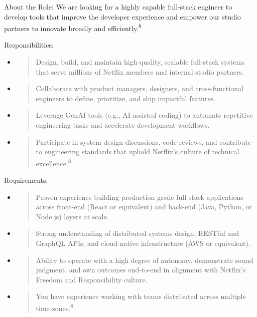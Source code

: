\documentclass[12pt,a4paper]{article}
\begin{document}
About the Role: We are looking for a highly capable full-stack engineer to develop tools that improve the developer experience and empower our studio partners to innovate broadly and efficiently.\textsuperscript{8}

Responsibilities:

\begin{itemize}
\item
  \begin{quote}
  Design, build, and maintain high-quality, scalable full-stack systems that serve millions of Netflix members and internal studio partners.
  \end{quote}
\item
  \begin{quote}
  Collaborate with product managers, designers, and cross-functional engineers to define, prioritize, and ship impactful features.
  \end{quote}
\item
  \begin{quote}
  Leverage GenAI tools (e.g., AI-assisted coding) to automate repetitive engineering tasks and accelerate development workflows.
  \end{quote}
\item
  \begin{quote}
  Participate in system design discussions, code reviews, and contribute to engineering standards that uphold Netflix's culture of technical excellence.\textsuperscript{8}
  \end{quote}
\end{itemize}

Requirements:

\begin{itemize}
\item
  \begin{quote}
  Proven experience building production-grade full-stack applications across front-end (React or equivalent) and back-end (Java, Python, or Node.js) layers at scale.
  \end{quote}
\item
  \begin{quote}
  Strong understanding of distributed systems design, RESTful and GraphQL APIs, and cloud-native infrastructure (AWS or equivalent).
  \end{quote}
\item
  \begin{quote}
  Ability to operate with a high degree of autonomy, demonstrate sound judgment, and own outcomes end-to-end in alignment with Netflix's Freedom and Responsibility culture.
  \end{quote}
\item
  \begin{quote}
  You have experience working with teams distributed across multiple time zones.\textsuperscript{8}
  \end{quote}
\end{itemize}
\end{document}
